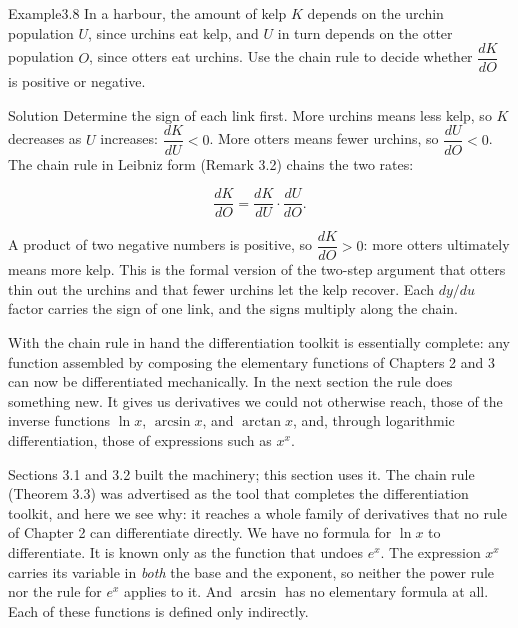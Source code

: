 \documentclass[a4paper,12pt,oneside]{memoir}
\begin{document}
\begin{workedexample}
\begin{envexample}{Example}{3.8}{}
In a harbour, the amount of kelp \(K\) depends on the urchin population \(U\), since urchins eat kelp, and \(U\) in turn depends on the otter population \(O\), since otters eat urchins. Use the chain rule to decide whether \(\dfrac{dK}{dO}\) is positive or negative.
\end{envexample}
\begin{envsolution}{Solution}{}{}
Determine the sign of each link first. More urchins means less kelp, so \(K\) decreases as \(U\) increases: \(\dfrac{dK}{dU} < 0\). More otters means fewer urchins, so \(\dfrac{dU}{dO} < 0\). The chain rule in Leibniz form (Remark 3.2) chains the two rates:

\[ \frac{dK}{dO} = \frac{dK}{dU}\cdot\frac{dU}{dO}. \]

A product of two negative numbers is positive, so \(\dfrac{dK}{dO} > 0\): more otters ultimately means more kelp. This is the formal version of the two-step argument that otters thin out the urchins and that fewer urchins let the kelp recover. Each \(dy/du\) factor carries the sign of one link, and the signs multiply along the chain.
\end{envsolution}
\end{workedexample}
With the chain rule in hand the differentiation toolkit is essentially complete: any function assembled by composing the elementary functions of Chapters 2 and 3 can now be differentiated mechanically. In the next section the rule does something new. It gives us derivatives we could not otherwise reach, those of the inverse functions \(\ln x\), \(\arcsin x\), and \(\arctan x\), and, through logarithmic differentiation, those of expressions such as \(x^{x}\).


Sections 3.1 and 3.2 built the machinery; this section uses it. The chain rule (Theorem 3.3) was advertised as the tool that completes the differentiation toolkit, and here we see why: it reaches a whole family of derivatives that no rule of Chapter 2 can differentiate directly. We have no formula for \(\ln x\) to differentiate. It is known only as the function that undoes \(e^{x}\). The expression \(x^{x}\) carries its variable in \emph{both} the base and the exponent, so neither the power rule nor the rule for \(e^{x}\) applies to it. And \(\arcsin\) has no elementary formula at all. Each of these functions is defined only indirectly.
\end{document}

